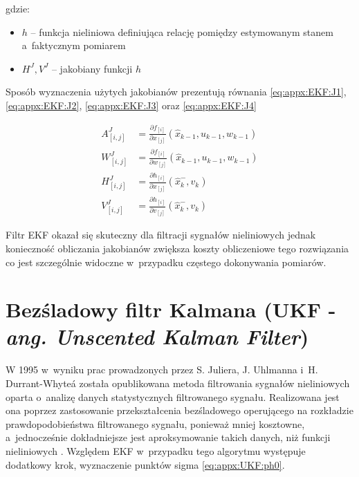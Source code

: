 gdzie:
\begin{itemize}
	\item $h$ -- funkcja nieliniowa definiująca relację pomiędzy estymowanym stanem a~faktycznym pomiarem
	\item $H^J, V^J$ -- jakobiany funkcji $h$
\end{itemize}

Sposób wyznaczenia użytych jakobianów prezentują równania \eqref{eq:appx:EKF:J1}, \eqref{eq:appx:EKF:J2}, \eqref{eq:appx:EKF:J3} oraz \eqref{eq:appx:EKF:J4}

\begin{subequations}
	\begin{align}
	A^J_{[i, j]} & = \frac{\partial f_{[i]}}{\partial x_{[j]}}(\widehat{x}_{k-1}, u_{k-1}, w_{k-1}) \label{eq:appx:EKF:J1} \\
	W^J_{[i, j]} & = \frac{\partial f_{[i]}}{\partial w_{[j]}}(\widehat{x}_{k-1}, u_{k-1}, w_{k-1}) \label{eq:appx:EKF:J2} \\
	H^J_{[i, j]} & = \frac{\partial h_{[i]}}{\partial x_{[j]}}(\widehat{x}^-_k, v_k) \label{eq:appx:EKF:J3}                \\
	V^J_{[i, j]} & = \frac{\partial h_{[i]}}{\partial v_{[j]}}(\widehat{x}^-_k, v_k) \label{eq:appx:EKF:J4}                
	\end{align}
\end{subequations}

Filtr EKF okazał się skuteczny dla filtracji sygnałów nieliniowych jednak konieczność obliczania jakobianów zwiększa koszty obliczeniowe tego rozwiązania co jest szczególnie widoczne w~przypadku częstego dokonywania pomiarów. 


\section*{Bezśladowy filtr Kalmana (UKF - \emph{ang. Unscented Kalman Filter})}
\label{sec:appx:filters:UKF}
W 1995 w~wyniku prac prowadzonych przez S. Juliera, J. Uhlmanna i~H. Durrant-Whyte\'a została opublikowana \cite{Julier1995} metoda filtrowania sygnałów nieliniowych oparta o~analizę danych statystycznych filtrowanego sygnału. Realizowana jest ona poprzez zastosowanie przekształcenia bezśladowego operującego na rozkładzie prawdopodobieństwa filtrowanego sygnału, ponieważ mniej kosztowne, a~jednocześnie dokładniejsze jest aproksymowanie takich danych, niż funkcji nieliniowych \cite{Uhlmann94}.
Względem EKF w~przypadku tego algorytmu występuje dodatkowy krok, wyznaczenie punktów sigma \eqref{eq:appx:UKF:ph0}. 

